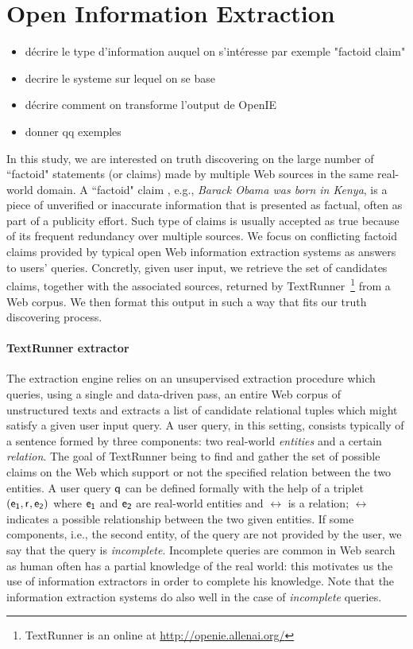 \section{Open Information Extraction}
\begin{itemize}
 \item décrire le type d'information auquel on s'intéresse par exemple "factoid claim"
 \item decrire le systeme sur lequel on se base
 \item décrire comment on transforme l'output de OpenIE
 \item donner qq exemples
\end{itemize}


In this study, we are interested on truth discovering on the large number of ``factoid" statements
(or claims) made by multiple Web sources in the same real-world domain. A ``factoid" claim , e.g., 
\emph{Barack Obama was born in Kenya}, is
a piece of unverified or inaccurate information that is presented as factual, often
as part of a publicity effort. Such type of claims  is usually accepted as true  because of its
frequent redundancy over multiple sources. We focus on conflicting factoid claims provided by typical 
open Web information extraction systems as answers to users' queries. Concretly, given user input, 
we retrieve the set of candidates claims, together with the associated sources, returned by TextRunner~\footnote{TextRunner is an online
at \href{http://openie.allenai.org/}{http://openie.allenai.org/}}
from a Web corpus. We then format this output in such a way that fits our truth discovering process.



\paragraph*{TextRunner extractor}
The extraction engine relies on an unsupervised extraction procedure which queries, using a single and data-driven 
pass, an entire Web corpus of unstructured texts and extracts a list of candidate relational tuples which might
satisfy a given user input query. A user query, in this setting, consists typically of a sentence formed by three
components: two real-world \emph{entities} and a certain \emph{relation}. The goal of TextRunner being to find and
gather the set of possible claims on the Web which support or not the specified relation between the two entities. 
A user query $\mathsf{q}$ can be defined formally with the help of a triplet $(\mathsf{e_{1}}, \mathsf{r}_{}, \mathsf{e_{2}})$ where $\mathsf{e_{1}}$ and $\mathsf{e_{2}}$ 
are real-world entities and $\rel{}$ is a relation; $\rel{}$ indicates a possible relationship between the
two given entities. If some components, i.e., the second entity, of the query are not provided by the user, we 
say that the query is \emph{incomplete}. Incomplete queries are common in Web search as human often has a partial
knowledge of the real world: this motivates us the use of information extractors in order to complete his knowledge.
Note that the information extraction systems do also well in the case of \emph{incomplete} queries.

